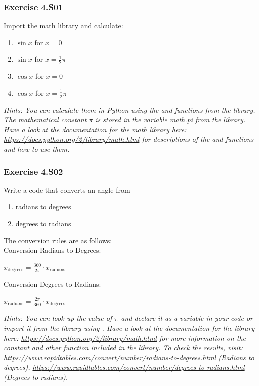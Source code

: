 
\subsubsection*{Exercise 4.S01}
Import the math library and calculate:
\begin{enumerate}[label=(\alph*)]
	\item $\sin{x}$ for $x = 0$
	\item $\sin{x}$ for $x = \frac{1}{2}\pi$
	\item $\cos{x}$ for $x = 0$
	\item $\cos{x}$ for $x = \frac{1}{2}\pi$
\end{enumerate}

\textit{Hints:
You can calculate them in Python using the {} and {} functions from the {} library. The mathematical constant $\pi$ is stored in the variable math.pi from the {} library.\\
Have a look at the documentation for the math library here:
\url{https://docs.python.org/2/library/math.html} for descriptions of the {} and {} functions and how to use them.}\\[1cm]



\subsubsection*{Exercise 4.S02}
Write a code that converts an angle from
\begin{enumerate}[label=(\alph*)]
	\item radians to degrees
	\item degrees to radians
\end{enumerate}
The conversion rules are as follows:\\
Conversion Radians to Degrees:
\begin{center}
	$x_{\textrm{degrees}} = \frac{360}{2\pi} \cdot x_{\textrm{radians}}$
\end{center}
Conversion Degrees to Radians:
\begin{center}
	$x_{\textrm{radians}} = \frac{2\pi}{360} \cdot x_{\textrm{degrees}}$
\end{center}

\textit{Hints:
You can look up the value of $\pi$ and declare it as a variable in your code or import it from the {} library using {}. Have a look at the documentation for the {} library here: \url{https://docs.python.org/2/library/math.html} for more information on the {} constant and other function included in the {} library. To check the results, visit:\\
\url{https://www.rapidtables.com/convert/number/radians-to-degrees.html} (Radians to degrees), 
\url{https://www.rapidtables.com/convert/number/degrees-to-radians.html} (Degrees to radians).}\\[1cm]



